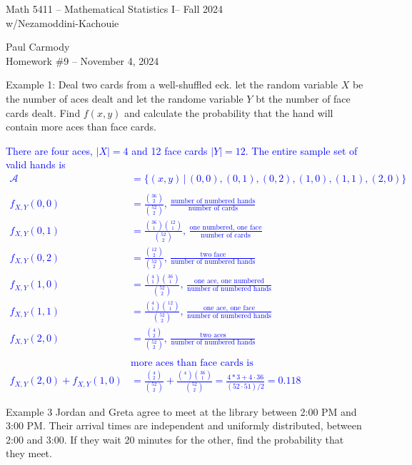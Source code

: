 \documentclass[10pt,a4paper]{report}
\newcommand{\CLASSNAME}{Math 5411 -- Mathematical Statistics I}
\newcommand{\PROFESSOR}{Nezamoddini-Kachouie}
\newcommand{\STUDENTNAME}{Paul Carmody}
\newcommand{\ASSIGNMENT}{Homework \#9 }
\newcommand{\DUEDATE}{November 4, 2024}
\newcommand{\SEMESTER}{Fall 2024}
\newcommand{\BLUE}[1]{\textcolor{blue}{#1}}
\begin{document}
\begin{center}
	\Large{\CLASSNAME -- \SEMESTER} \\
	\large{w/\PROFESSOR}
\end{center}
\begin{center}
	\STUDENTNAME \\
	\ASSIGNMENT -- \DUEDATE\\
\end{center}

\noindent Example 1: Deal two cards from a well-shuffled eck. let the random variable $X$ be the number of aces dealt and let the randome variable $Y$ bt the number of face cards dealt.  Find $f(x,y)$ and calculate the probability that the hand will contain more aces than face cards.

\BLUE{There are four aces, $|X| = 4$ and 12 face cards $|Y| = 12$.  The entire sample set of valid hands is 
\begin{align*}
	\mathcal{A} &= \{(x,y)\,|\, (0,0), (0,1), (0,2), (1,0), (1,1), (2,0) \} \\ \\
	f_{X,Y}(0,0) &= \frac{\binom{36}{2}}{\binom{52}{2}}, \, \frac{\text{number of numbered hands}}{\text{number of cards}}\\
	f_{X,Y}(0,1) &= \frac{\binom{36}{1}\binom{12}{1}}{\binom{52}{2}}, \, \frac{\text{one numbered, one face}}{\text{number of cards}}\\
	f_{X,Y}(0,2) &= \frac{\binom{12}{2}}{\binom{52}{2}}, \, \frac{\text{two face}}{\text{number of numbered hands}}\\
	f_{X,Y}(1,0) &= \frac{\binom{4}{1}\binom{36}{1}}{\binom{52}{2}}, \, \frac{\text{one ace, one numbered}}{\text{number of numbered hands}}\\
	f_{X,Y}(1,1) &= \frac{\binom{4}{1}\binom{12}{1}}{\binom{52}{2}}, \, \frac{\text{one ace, one face}}{\text{number of numbered hands}}\\
	f_{X,Y}(2,0) &= \frac{\binom{4}{2}}{\binom{52}{2}}, \, \frac{\text{two aces}}{\text{number of numbered hands}}\\
	\\
	&\text{more aces than face cards is }\\
	f_{X,Y}(2,0)+f_{X,Y}(1,0) &= \frac{\binom{4}{2}}{\binom{52}{2}} + \frac{\binom{4}{}\binom{36}{1}}{\binom{52}{2}} = \frac{4*3+4\cdot 36}{(52\cdot 51)/2} = 0.118
\end{align*}
}

\noindent Example 3  Jordan and Greta agree to meet at the library between 2:00 PM and 3:00 PM.  Their arrival times are independent and uniformly distributed, between 2:00 and 3:00.  If they wait 20 minutes for the other, find the probability that they meet.
\end{document}
